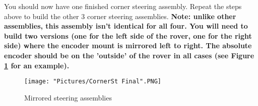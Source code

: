 \documentclass[12pt]{article}
\begin{document}
\begin{enumerate}
You should now have one finished corner steering assembly. Repeat the 
steps above to build the other 3 corner steering assemblies. \textbf{Note: unlike other assemblies, this assembly 
isn't identical for all four. You will need to build two versions (one for the left side of the rover, one for the 
right side) where the encoder mount is mirrored left to right.  The absolute encoder should be on the 'outside' of 
the rover in all cases (see Figure \ref{corner steering 5} for an example).}

\begin{figure}[H]
  \centering
  \begin{minipage}[b]{0.45\textwidth}
    \texttt{[image: "Pictures/CornerSt Final".PNG]}
  \end{minipage}
  \caption{Mirrored steering assemblies}
  \label{corner steering 5}
\end{figure}

\end{enumerate}
\end{document}
